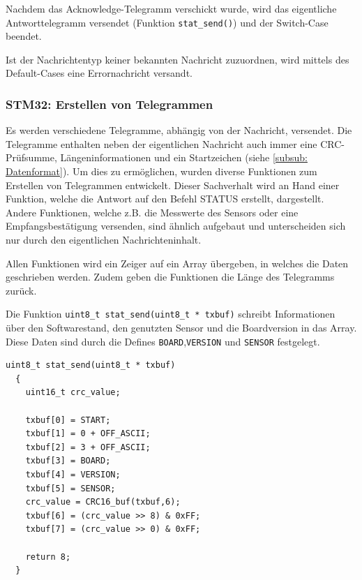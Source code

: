 \smallskip

Nachdem das Acknowledge-Telegramm verschickt wurde, wird das eigentliche Antworttelegramm versendet (Funktion \lstinline!stat_send()!)
und der Switch-Case beendet.

\smallskip

Ist der Nachrichtentyp keiner bekannten Nachricht zuzuordnen, wird mittels des Default-Cases eine Errornachricht versandt.

\subsubsection{STM32: Erstellen von Telegrammen}
\label{subsub: STM_Telegramm}

Es werden verschiedene Telegramme, abhängig von der Nachricht, versendet. Die Telegramme enthalten neben der eigentlichen Nachricht auch immer eine CRC-Prüfsumme,
Längeninformationen und ein Startzeichen (siehe \ref{subsub: Datenformat}). Um dies zu ermöglichen, wurden diverse Funktionen zum Erstellen von Telegrammen entwickelt.
Dieser Sachverhalt wird an Hand einer Funktion, welche die Antwort auf den Befehl STATUS erstellt, dargestellt. Andere Funktionen, welche z.B. die Messwerte des Sensors
oder eine Empfangsbestätigung versenden, sind ähnlich aufgebaut und unterscheiden sich nur durch den eigentlichen Nachrichteninhalt.

\smallskip

Allen Funktionen wird ein Zeiger auf ein Array übergeben, in welches die Daten geschrieben werden. Zudem geben die Funktionen die Länge des Telegramms zurück.

\smallskip

Die Funktion \lstinline!uint8_t stat_send(uint8_t * txbuf)! schreibt Informationen über den Softwarestand, den genutzten Sensor und die Boardversion in das Array. Diese
Daten sind durch die Defines \lstinline!BOARD!,\lstinline!VERSION! und \lstinline!SENSOR! festgelegt.

\begin{lstlisting}[caption={\textit{Status-Telegramm}}]
  uint8_t stat_send(uint8_t * txbuf)
  {
    uint16_t crc_value;
    
    txbuf[0] = START; 
    txbuf[1] = 0 + OFF_ASCII;
    txbuf[2] = 3 + OFF_ASCII;
    txbuf[3] = BOARD;
    txbuf[4] = VERSION;
    txbuf[5] = SENSOR;
    crc_value = CRC16_buf(txbuf,6);
    txbuf[6] = (crc_value >> 8) & 0xFF;				
    txbuf[7] = (crc_value >> 0) & 0xFF;
  
    return 8;										
  }
\end{lstlisting}

